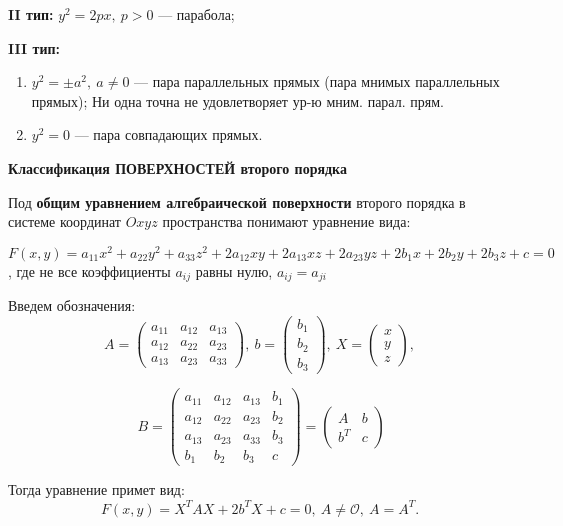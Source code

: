 \textbf{II тип:} $y^2 =2px,~p>0$ --- парабола;

\textbf{III тип:}
\begin{enumerate}
    \item $y^2 = \pm a^2,~a\neq 0$ --- пара параллельных прямых (пара мнимых параллельных прямых); Ни одна точна не удовлетворяет ур-ю мним. парал. прям.
    \item $y^2 = 0$ --- пара совпадающих прямых.
\end{enumerate}

\bigbreak

\textbf{Классификация ПОВЕРХНОСТЕЙ второго порядка}

Под \textbf{общим уравнением алгебраической поверхности} второго порядка в системе координат $Oxyz$ пространства понимают уравнение вида:

$F(x,y) = a_{11}x^2+a_{22}y^2+a_{33}z^2+2a_{12}xy+2a_{13}xz+2a_{23}yz+2b_1x+2b_2y+2b_3z+c=0$,
где не все коэффициенты $a_{ij}$ равны нулю, $a_{ij} = a_{ji}$

Введем обозначения:
$$A = \begin{pmatrix} a_{11} & a_{12} & a_{13} \\a_{12} & a_{22} & a_{23} \\ a_{13} & a_{23} & a_{33}\end{pmatrix},~ b=\begin{pmatrix} b_1 \\ b_2 \\ b_3 \end{pmatrix},~ X=\begin{pmatrix}x \\ y \\ z\end{pmatrix},
$$

$$~B = \begin{pmatrix} a_{11} & a_{12} & a_{13} & b_1 \\a_{12} & a_{22} & a_{23} & b_2 \\ a_{13} & a_{23} & a_{33} & b_3 \\ b_1 & b_2 & b_3 & c \end{pmatrix} = \begin{pmatrix} A & b \\ b^T & c\end{pmatrix}$$

Тогда уравнение примет вид:
$$F(x, y) = X^TAX+2b^TX+c=0,~A\neq\mathcal{O},~A=A^T.$$

